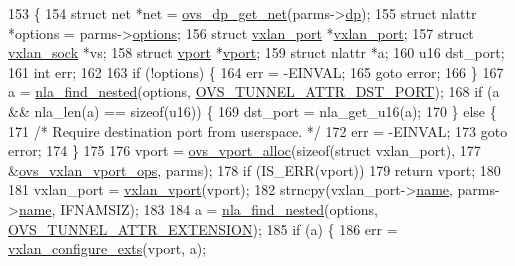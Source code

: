 \begin{DoxyCode}
153 \{
154     \textcolor{keyword}{struct }net *net = \hyperlink{datapath_8h_aef2302004ca1f45133eaef00bb3740eb}{ovs\_dp\_get\_net}(parms->\hyperlink{structvport__parms_a15faa866e3d35a721de77b347017499e}{dp});
155     \textcolor{keyword}{struct }nlattr *options = parms->\hyperlink{structvport__parms_a5c6027e758731e1a16968e77d4e2ca7c}{options};
156     \textcolor{keyword}{struct }\hyperlink{structvxlan__port}{vxlan\_port} *\hyperlink{structvxlan__port}{vxlan\_port};
157     \textcolor{keyword}{struct }\hyperlink{structvxlan__sock}{vxlan\_sock} *vs;
158     \textcolor{keyword}{struct }\hyperlink{structvport}{vport} *\hyperlink{structvport}{vport};
159     \textcolor{keyword}{struct }nlattr *a;
160     u16 dst\_port;
161     \textcolor{keywordtype}{int} err;
162 
163     \textcolor{keywordflow}{if} (!options) \{
164         err = -EINVAL;
165         \textcolor{keywordflow}{goto} error;
166     \}
167     a = \hyperlink{net_2netlink_8h_a5b73cd8f4a1d3d335642ee1492b7b2c2}{nla\_find\_nested}(options, \hyperlink{openvswitch_8h_a96a58e29e8dbf2b5bdeb775cba46556eae2bec9320cf2cc32228c9783e1bba39a}{OVS\_TUNNEL\_ATTR\_DST\_PORT});
168     \textcolor{keywordflow}{if} (a && nla\_len(a) == \textcolor{keyword}{sizeof}(u16)) \{
169         dst\_port = nla\_get\_u16(a);
170     \} \textcolor{keywordflow}{else} \{
171         \textcolor{comment}{/* Require destination port from userspace. */}
172         err = -EINVAL;
173         \textcolor{keywordflow}{goto} error;
174     \}
175 
176     vport = \hyperlink{linux_2vport_8c_a9198ee06111592d2cf6c3b2bf94561c1}{ovs\_vport\_alloc}(\textcolor{keyword}{sizeof}(\textcolor{keyword}{struct} vxlan\_port),
177                 &\hyperlink{vport-vxlan_8c_a14100e1b742c7bb52f41541582330814}{ovs\_vxlan\_vport\_ops}, parms);
178     \textcolor{keywordflow}{if} (IS\_ERR(vport))
179         \textcolor{keywordflow}{return} vport;
180 
181     vxlan\_port = \hyperlink{vport-vxlan_8c_ab19470f9c73474113f37dc3c65265294}{vxlan\_vport}(vport);
182     strncpy(vxlan\_port->\hyperlink{structvxlan__port_a48b3eb83bbca17229480cf0d7a130272}{name}, parms->\hyperlink{structvport__parms_a4f27e2a7b7dc0493c095cdaabe225b38}{name}, IFNAMSIZ);
183 
184     a = \hyperlink{net_2netlink_8h_a5b73cd8f4a1d3d335642ee1492b7b2c2}{nla\_find\_nested}(options, \hyperlink{openvswitch_8h_a96a58e29e8dbf2b5bdeb775cba46556ea310d573fc264521a7d47f37295666999}{OVS\_TUNNEL\_ATTR\_EXTENSION});
185     \textcolor{keywordflow}{if} (a) \{
186         err = \hyperlink{vport-vxlan_8c_a1c323f01bc67db23967f87810a23939b}{vxlan\_configure\_exts}(vport, a);

\end{DoxyCode}
